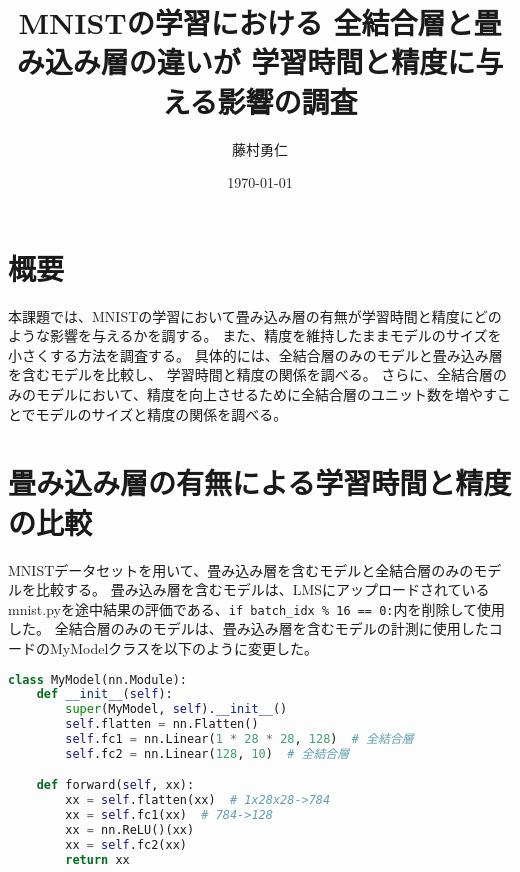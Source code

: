 \documentclass{ltjsarticle}
\title{
    MNISTの学習における
    全結合層と畳み込み層の違いが
    学習時間と精度に与える影響の調査
}
\author{藤村勇仁}
\date{\today}
\begin{document}


\TableOfContents
\section{概要}
    本課題では、MNISTの学習において畳み込み層の有無が学習時間と精度にどのような影響を与えるかを調する。
    また、精度を維持したままモデルのサイズを小さくする方法を調査する。
    具体的には、全結合層のみのモデルと畳み込み層を含むモデルを比較し、
    学習時間と精度の関係を調べる。
    さらに、全結合層のみのモデルにおいて、精度を向上させるために全結合層のユニット数を増やすことでモデルのサイズと精度の関係を調べる。

\section{畳み込み層の有無による学習時間と精度の比較}
    MNISTデータセットを用いて、畳み込み層を含むモデルと全結合層のみのモデルを比較する。
    畳み込み層を含むモデルは、LMSにアップロードされているmnist.pyを途中結果の評価である、\verb|if batch_idx % 16 == 0:|内を削除して使用した。
    全結合層のみのモデルは、畳み込み層を含むモデルの計測に使用したコードのMyModelクラスを以下のように変更した。
    \begin{lstlisting}[language=python]
class MyModel(nn.Module):
    def __init__(self):
        super(MyModel, self).__init__()
        self.flatten = nn.Flatten()
        self.fc1 = nn.Linear(1 * 28 * 28, 128)  # 全結合層
        self.fc2 = nn.Linear(128, 10)  # 全結合層

    def forward(self, xx):
        xx = self.flatten(xx)  # 1x28x28->784
        xx = self.fc1(xx)  # 784->128
        xx = nn.ReLU()(xx)
        xx = self.fc2(xx)
        return xx
    \end{lstlisting}
\end{document}
